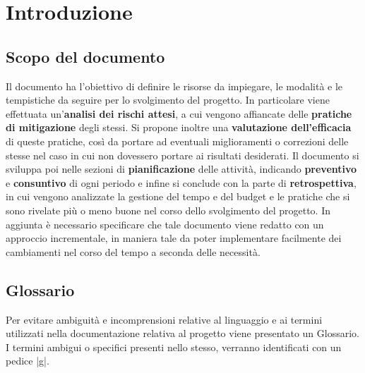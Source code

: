 \documentclass[10pt, a4paper]{article}
\title{\titolo}
\author{SWEetCode}
\begin{document}



\newpage

\tableofcontents
\newpage
\listoffigures
\newpage
\listoftables
\newpage


\section{Introduzione}


\subsection{Scopo del documento}
Il documento ha l'obiettivo di definire le risorse da impiegare, le modalità e le tempistiche da seguire per lo svolgimento del progetto. In particolare viene effettuata un'\textbf{analisi dei rischi attesi}, a cui vengono affiancate delle \textbf{pratiche di mitigazione} degli stessi. Si propone inoltre una \textbf{valutazione dell'efficacia} di queste pratiche, così da portare ad eventuali miglioramenti o correzioni delle stesse nel caso in cui non dovessero portare ai risultati desiderati.
Il documento si sviluppa poi nelle sezioni di \textbf{pianificazione} delle attività, indicando \textbf{preventivo} e \textbf{consuntivo} di ogni periodo e infine si conclude con la parte di \textbf{retrospettiva}, in cui vengono analizzate la gestione del tempo e del budget e le pratiche che si sono rivelate più o meno buone nel corso dello svolgimento del progetto.
In aggiunta è necessario specificare che tale documento viene redatto con un approccio incrementale, in maniera tale da poter implementare facilmente dei cambiamenti nel corso del tempo a seconda delle necessità.




\subsection{Glossario}
Per evitare ambiguità e incomprensioni relative al linguaggio e ai termini utilizzati nella documentazione relativa al progetto viene presentato un Glossario. I termini ambigui o specifici presenti nello stesso, verranno identificati con un pedice |g|.
\end{document}
